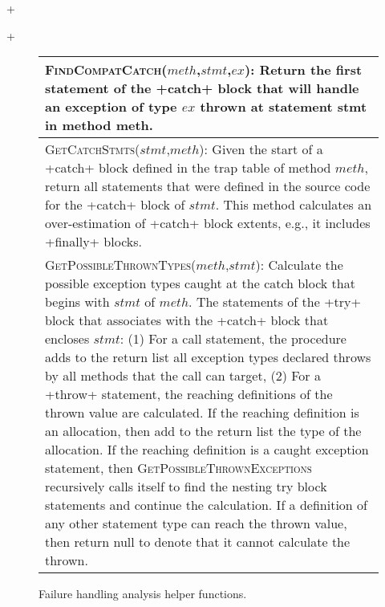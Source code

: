 \lstDeleteShortInline+

\lstMakeShortInline[basicstyle=\scriptsize\ttfamily,keywordstyle=\color{DarkPurple},breaklines=true]+

\begin{figure}[t]
\scriptsize
\renewcommand*{\arraystretch}{1.3}
\begin{tabular}{|p{3.3in}|}
\hline 

\textsc{FindCompatCatch}($meth$,$stmt$,$ex$): Return the first
  statement of the +catch+ block that will handle an
  exception of type $ex$ thrown at statement stmt in method meth.
\\
\hline
\textsc{GetCatchStmts}($stmt$,$meth$): Given the start of a
+catch+ block defined in the trap table of method $meth$,
return all statements that were defined in the source code for the
+catch+ block of $stmt$.  This method calculates an
over-estimation of +catch+ block extents, e.g., it includes
+finally+ blocks.
\\
\hline
\textsc{GetPossibleThrownTypes}($meth$,$stmt$): Calculate the
possible exception types caught at the catch block that begins with
$stmt$ of $meth$. The statements of the +try+ block that associates with the +catch+ block
that encloses $stmt$:  (1) For a call statement, the
procedure adds to the return list all exception types declared throws
by all methods that the call can target,  (2) For a +throw+
statement, the reaching definitions of the thrown value are
calculated.  If the reaching definition is an allocation, then add to
the return list the type of the allocation.  If the reaching
definition is a caught exception statement, then
\textsc{GetPossibleThrownExceptions} recursively calls itself to find
the nesting try block statements and continue the calculation.  If a
definition of any other statement type can reach the thrown value,
then return null to denote that it cannot calculate the
thrown.  
\\
\hline
\end{tabular}
\caption{\label{fig:helper-funs}Failure handling analysis helper functions.}
\vspace{-0.1in}
\end{figure}

